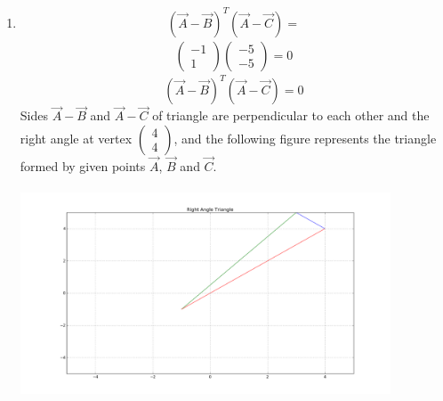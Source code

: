 \documentclass[journal,12pt,twocolumn]{IEEEtran}
\newcommand{\myvec}[1]{\ensuremath{\begin{pmatrix}#1\end{pmatrix}}}
\begin{document}
\begin{enumerate}
\item \begin {equation*}{(\vec{A}-\vec{B})}^T  (\vec{A}-\vec{C}) = \end {equation*}\begin{align} \myvec{ -1 \\ 1 }  \myvec{ -5 \\ -5 } = 0\end{align}
\begin {equation*}{(\vec{A}-\vec{B})}^T  (\vec{A}-\vec{C}) = 0  \end {equation*}
Sides $\vec{A}-\vec{B}$ and  $\vec{A}-\vec{C}$  of triangle are perpendicular to each other and the right angle at vertex \myvec{ 4 \\ 4 }, and the following figure represents the triangle formed by given points $\vec{A}$, $\vec{B}$ and $\vec{C}$.  
\includegraphics[width=11cm, height=7cm]{vihi}
\end{enumerate}
\end{document}
